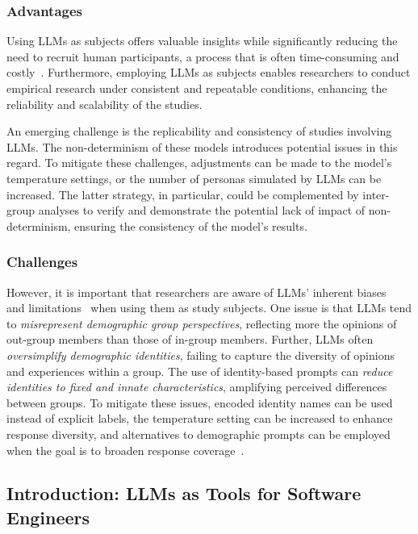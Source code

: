 \documentclass[11pt]{article}
\begin{document}
\subsubsection{Advantages}

Using LLMs as subjects offers valuable insights while significantly reducing the need to recruit human participants, a process that is often time-consuming and costly~\cite{DBLP:conf/vl/Madampe0HO24}. 
Furthermore, employing LLMs as subjects enables researchers to conduct empirical research under consistent and repeatable conditions, enhancing the reliability and scalability of the studies.

An emerging challenge is the replicability and consistency of studies involving LLMs. The non-determinism of these models introduces potential issues in this regard. To mitigate these challenges, adjustments can be made to the model's temperature settings, or the number of personas simulated by LLMs can be increased. The latter strategy, in particular, could be complemented by inter-group analyses to verify and demonstrate the potential lack of impact of non-determinism, ensuring the consistency of the model's results.

\subsubsection{Challenges}

However, it is important that researchers are aware of LLMs' inherent biases~\cite{Crowell2023} and limitations~\cite{DBLP:journals/ais/HardingDLL24, DBLP:journals/corr/abs-2402-01908} when using them as study subjects.
One issue is that LLMs tend to \emph{misrepresent demographic group perspectives}, reflecting more the opinions of out-group members than those of in-group members.
Further, LLMs often \emph{oversimplify demographic identities}, failing to capture the diversity of opinions and experiences within a group.
The use of identity-based prompts can \emph{reduce identities to fixed and innate characteristics}, amplifying perceived differences between groups.
To mitigate these issues, encoded identity names can be used instead of explicit labels, the temperature setting can be increased to enhance response diversity, and alternatives to demographic prompts can be employed when the goal is to broaden response coverage~\cite{DBLP:journals/ais/HardingDLL24, DBLP:journals/corr/abs-2402-01908}.


\subsection{Introduction: LLMs as Tools for Software Engineers}
\end{document}
